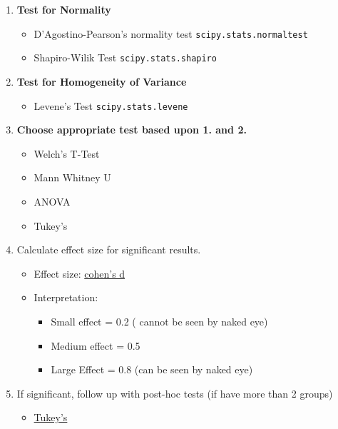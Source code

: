 \documentclass[11pt]{article}
\providecommand{\tightlist}{%
      \setlength{\itemsep}{0pt}\setlength{\parskip}{0pt}}
\begin{document}
\begin{enumerate}
\def\labelenumi{\arabic{enumi}.}
\tightlist
\item
  \textbf{Test for Normality}

  \begin{itemize}
  \tightlist
  \item
    D'Agostino-Pearson's normality test \texttt{scipy.stats.normaltest}
  \item
    Shapiro-Wilik Test \texttt{scipy.stats.shapiro}
  \end{itemize}
\item
  \textbf{Test for Homogeneity of Variance}

  \begin{itemize}
  \tightlist
  \item
    Levene's Test \texttt{scipy.stats.levene}
  \end{itemize}
\item
  \textbf{Choose appropriate test based upon 1. and 2.}

  \begin{itemize}
  \tightlist
  \item
    Welch's T-Test
  \item
    Mann Whitney U
  \item
    ANOVA
  \item
    Tukey's
  \end{itemize}
\item
  Calculate effect size for significant results.

  \begin{itemize}
  \tightlist
  \item
    Effect size:
    \href{https://stackoverflow.com/questions/21532471/how-to-calculate-cohens-d-in-python}{cohen's
    d}
  \item
    Interpretation:

    \begin{itemize}
    \tightlist
    \item
      Small effect = 0.2 ( cannot be seen by naked eye)
    \item
      Medium effect = 0.5
    \item
      Large Effect = 0.8 (can be seen by naked eye)
    \end{itemize}
  \end{itemize}
\item
  If significant, follow up with post-hoc tests (if have more than 2
  groups)

  \begin{itemize}
  \tightlist
  \item
    \href{https://www.statsmodels.org/stable/generated/statsmodels.stats.multicomp.pairwise_tukeyhsd.html}{Tukey's}
  \end{itemize}
\end{enumerate}
\end{document}
